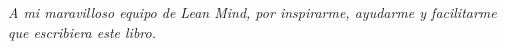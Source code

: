 \documentclass[10pt]{article}
\begin{document}
\begin{titlepage}\thispagestyle{empty}
  \vspace*{6cm}
  {\itshape\small\raggedleft A mi maravilloso equipo de Lean Mind, por inspirarme, ayudarme y facilitarme que escribiera este libro. \par}
  \restoregeometry
\end{titlepage}

\newpage\phantom{blabla}\thispagestyle{empty}
\end{document}
